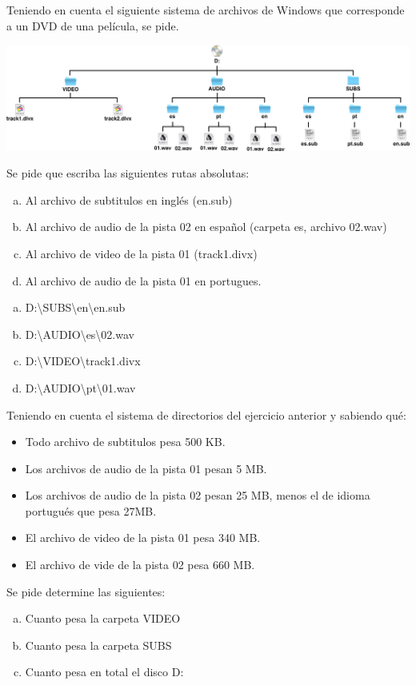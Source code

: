 \begin{exercise}
Teniendo en cuenta el siguiente sistema de archivos de Windows que
corresponde a un DVD de una película, se pide.

\centerline{\includegraphics[scale=0.4]{unidades/2_informacion/2_informatica/imagenes/directorios_windows_4.png}}

Se pide que escriba las siguientes rutas absolutas:
\begin{enumerate}[a)]
    \item Al archivo de subtitulos en inglés (en.sub)
    \item Al archivo de audio de la pista 02 en español (carpeta es, archivo 02.wav)
    \item Al archivo de video de la pista 01 (track1.divx)
    \item Al archivo de audio de la pista 01 en portugues.
\end{enumerate}
\end{exercise}

\begin{enumerate}[a)]
    \item D:\textbackslash SUBS\textbackslash en\textbackslash en.sub
    \item D:\textbackslash AUDIO\textbackslash es\textbackslash 02.wav
    \item D:\textbackslash VIDEO\textbackslash track1.divx
    \item D:\textbackslash AUDIO\textbackslash pt\textbackslash 01.wav
\end{enumerate}
\vspace{1cm}

\begin{exercise}
Teniendo en cuenta el sistema de directorios del ejercicio anterior y
sabiendo qué:
\begin{itemize}
    \item Todo archivo de subtitulos pesa 500 KB.
    \item Los archivos de audio de la pista 01 pesan 5 MB.
    \item Los archivos de audio de la pista 02 pesan 25 MB, menos el de idioma
        portugués que pesa 27MB.
    \item El archivo de video de la pista 01 pesa 340 MB.
    \item El archivo de vide de la pista 02 pesa 660 MB.
\end{itemize}

Se pide determine las siguientes:
\begin{enumerate}[a)]
    \item Cuanto pesa la carpeta VIDEO
    \item Cuanto pesa la carpeta SUBS
    \item Cuanto pesa en total el disco D:
\end{enumerate}
\end{exercise}

